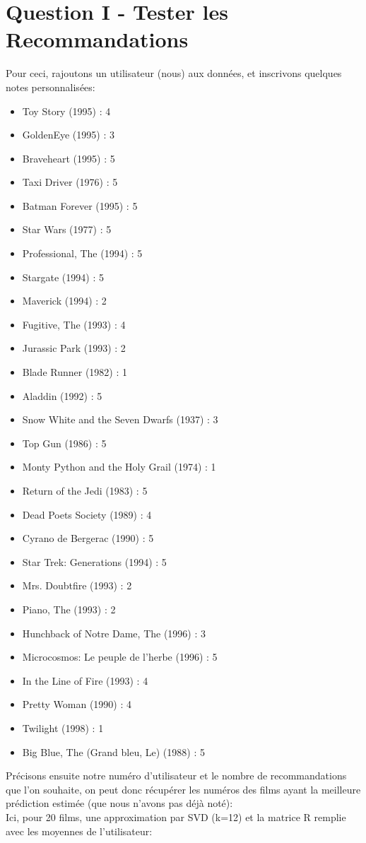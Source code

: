 \documentclass[12pt,a4paper]{article}
\begin{document}
\section{Question I - Tester les Recommandations}
 
Pour ceci, rajoutons un utilisateur (nous) aux données, et inscrivons quelques notes personnalisées:\\

\begin{itemize}
\item Toy Story (1995) : 4
\item GoldenEye (1995) : 3
\item Braveheart (1995) : 5
\item Taxi Driver (1976) : 5
\item Batman Forever (1995) : 5
\item Star Wars (1977) : 5
\item Professional, The (1994) : 5
\item Stargate (1994) : 5
\item Maverick (1994) : 2
\item Fugitive, The (1993) : 4
\item Jurassic Park (1993) : 2
\item Blade Runner (1982) : 1
\item Aladdin (1992) : 5
\item Snow White and the Seven Dwarfs (1937) : 3
\item Top Gun (1986) : 5
\item Monty Python and the Holy Grail (1974) : 1
\item Return of the Jedi (1983) : 5
\item Dead Poets Society (1989) : 4
\item Cyrano de Bergerac (1990) : 5
\item Star Trek: Generations (1994) : 5
\item Mrs. Doubtfire (1993) : 2
\item Piano, The (1993) : 2
\item Hunchback of Notre Dame, The (1996) : 3
\item Microcosmos: Le peuple de l'herbe (1996) : 5
\item In the Line of Fire (1993) : 4
\item Pretty Woman (1990) : 4
\item Twilight (1998) : 1
\item Big Blue, The (Grand bleu, Le) (1988) : 5
\end{itemize}
\vspace{1cm}
Précisons ensuite notre numéro d'utilisateur et le nombre de recommandations que l'on souhaite, on peut donc récupérer les numéros des films ayant la meilleure prédiction estimée (que nous n'avons pas déjà noté):\\
Ici, pour 20 films, une approximation par SVD (k=12) et la matrice R remplie avec les moyennes de l'utilisateur:\\
\end{document}

